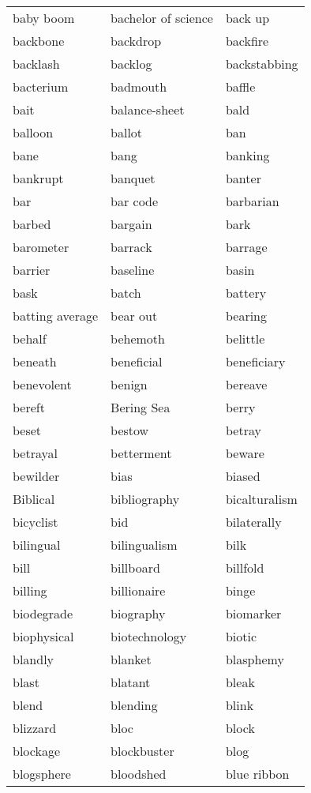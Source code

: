 \documentclass{minimal}
\begin{document}
\begin{longtable}{p{2.7cm}@{\hskip 0.2cm}p{2.7cm}@{\hskip 0.2cm}p{2.7cm}}
baby boom & bachelor of science & back up \\
backbone & backdrop & backfire \\
backlash & backlog & backstabbing \\
bacterium & badmouth & baffle \\
bait & balance-sheet & bald \\
balloon & ballot & ban \\
bane & bang & banking \\
bankrupt & banquet & banter \\
bar & bar code & barbarian \\
barbed & bargain & bark \\
barometer & barrack & barrage \\
barrier & baseline & basin \\
bask & batch & battery \\
batting average & bear out & bearing \\
behalf & behemoth & belittle \\
beneath & beneficial & beneficiary \\
benevolent & benign & bereave \\
bereft & Bering Sea & berry \\
beset & bestow & betray \\
betrayal & betterment & beware \\
bewilder & bias & biased \\
Biblical & bibliography & bicalturalism \\
bicyclist & bid & bilaterally \\
bilingual & bilingualism & bilk \\
bill & billboard & billfold \\
billing & billionaire & binge \\
biodegrade & biography & biomarker \\
biophysical & biotechnology & biotic \\
blandly & blanket & blasphemy \\
blast & blatant & bleak \\
blend & blending & blink \\
blizzard & bloc & block \\
blockage & blockbuster & blog \\
blogsphere & bloodshed & blue ribbon \\

\end{longtable}
\end{document}

